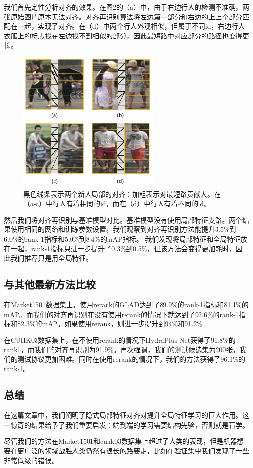 我们首先定性分析对齐的效果。在图2的（a）中，由于右边行人的检测不准确，两张原始图片原本无法对齐。对齐再识别算法将左边第一部分和右边的上上个部分匹配在一起，实现了对齐。在（d）中两个行人外观相似，但属于不同id，右边行人衣服上的标志找在左边找不到相似的部分，因此最短路中对应部分的路径也变得更长。

\begin{figure}[!htbp]
\centering
\includegraphics[width=.45\linewidth,keepaspectratio]{data/waiwenfanyi/fig2.png}
\caption{黑色线条表示两个新人局部的对齐：加粗表示对最短路贡献大。在（a-c）中行人有着相同的id，而在（d）中行人有着不同的id。}
\label{figure:fig2}
\end{figure}

然后我们将对齐再识别与基准模型对比。基准模型没有使用局部特征支路。两个结果使用相同的网络和训练参数设置。我们观察到对齐再识别方法能提升3.5\%到6.0\%的rank-1指标和5.0\%到8.4\%的mAP指标。
我们发现将局部特征和全局特征放在一起，rank-1指标只进一步提升了0.3\%到0.5\%，但该方法会变得更加耗时，因此我们推荐只是用全局特征。

\subsection{与其他最新方法比较}

在Market1501数据集上，使用rerank的GLAD达到了89.9\%的rank-1指标和81.1\%的mAP。而我们的对齐再识别在没有使用rerank的情况下就达到了92.6\%的rank-1指标和82.3\%的mAP。如果使用rerank，则进一步提升到94\%和91.2\%

在CUHK03数据集上，在不使用rerank的情况下HydraPlus-Net获得了91.8\%的rank1，而我们的对齐再识别为91.9\%。再次强调，我们的测试候选集为200张，我们的测试协议更加困难。同时在使用rerank的情况下，我们的方法获得了96.1\%的rank-1。

\subsection{总结}
在这篇文章中，我们阐明了隐式局部特征对齐对提升全局特征学习的巨大作用。这一惊奇的结果给予了我们重要启发：端到端的学习需要结构先验，否则就是盲学。

尽管我们的方法在Market1501和cuhk03数据集上超过了人类的表现，但是机器想要在更广泛的领域战胜人类仍然有很长的路要走，比如在验证集中我们发现了一些非常低级的错误。

